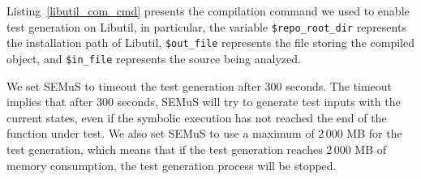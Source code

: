 Listing~\ref{libutil_com_cmd} presents the compilation command we used to enable test generation on Libutil, in particular, the variable \texttt{\$repo\_root\_dir} represents the installation path of Libutil, \texttt{\$out\_file} represents the file storing the compiled object, and \texttt{\$in\_file} represents the source being analyzed.

We set SEMuS to timeout the test generation after 300 seconds. The timeout implies that after 300 seconds, SEMuS will try to generate test inputs with the current states, even if the symbolic execution has not reached the end of the function under test.
We also set SEMuS to use a maximum of 2\,000 MB for the test generation, which means that if the test generation reaches 2\,000 MB of memory consumption, the test generation process will be stopped.


